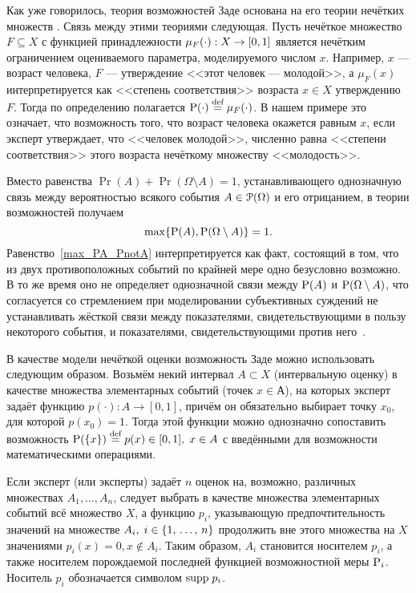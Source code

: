 \begin{notice}
Как уже говорилось, теория возможностей Заде основана на его теории нечётких множеств \cite{ZadehPrime}. Связь между этими теориями следующая. Пусть нечёткое множество $F \subseteq X$ с функцией принадлежности $\mu_{F}(\cdot): X \rightarrow \zo$ является нечётким ограничением \cite{citeZadeh} оцениваемого параметра, моделируемого числом $x$. Например, $x$ --- возраст человека, $F$ --- утверждение <<этот человек --- молодой>>, а $\mu_{F}(x)$ интерпретируется как <<степень соответствия>> возраста $x \in X$ утверждению $F$. Тогда по определению полагается $\P(\cdot) \defeq \mu_{F}(\cdot)$. В нашем примере это означает, что возможность того, что возраст человека окажется равным $x$, если эксперт утверждает, что <<человек молодой>>, численно равна <<степени соответствия>> этого возраста нечёткому множеству <<молодость>>. 
\end{notice}
\begin{notice}
Вместо равенства $\Pr(A) + \Pr(\Omega\setminus A) = 1$, устанавливающего однозначную связь между вероятностью всякого события $A\in\Po(\Omega)$ и его отрицанием, в теории возможностей получаем
\begin{equation}
\label{max_PA_PnotA}
    \max\{\P(A), \P(\Omega\setminus A)\} = 1.
\end{equation}
Равенство~\eqref{max_PA_PnotA} интерпретируется как факт, состоящий в том, что из двух противоположных событий по крайней мере одно безусловно возможно. В то же время оно не определяет однозначной связи между $\P(A)$ и $\P(\Omega\setminus A)$, что согласуется со стремлением при моделировании субъективных суждений не устанавливать жёсткой связи между показателями, свидетельствующими в пользу некоторого события, и показателями, свидетельствующими против него~\cite{dubois_prade-1990}.
\end{notice}

В качестве модели нечёткой оценки возможность Заде можно использовать следующим образом. Возьмём некий интервал $A \subset X$  (интервальную оценку) в качестве множества элементарных событий (точек $x \in А$), на которых эксперт задаёт функцию $p(\cdot): A \rightarrow [0,1]$, причём он обязательно выбирает точку $x_0$, для которой $p(x_0) = 1$. Тогда этой функции можно однозначно сопоставить возможность $\P(\{x\}) \define= p(x) \in \zo,\; x\in A$ с введёнными для возможности математическими операциями.    

Если эксперт (или эксперты) задаёт $n$ оценок на, возможно, различных множествах $A_1, \ldots, A_n$, следует выбрать в качестве множества элементарных событий всё множество $X$, а функцию $p_i$, указывающую предпочтительность значений на множестве $A_i,\; i \in \setN$ продолжить вне этого множества на $X$ значениями $p_i(x) = 0, x \notin A_i$. Таким образом, $A_i$ становится носителем $p_i$, а также носителем порождаемой последней функцией возможностной меры $\P_i$. Носитель $p_i$ обозначается символом $\supp\; p_i$.


